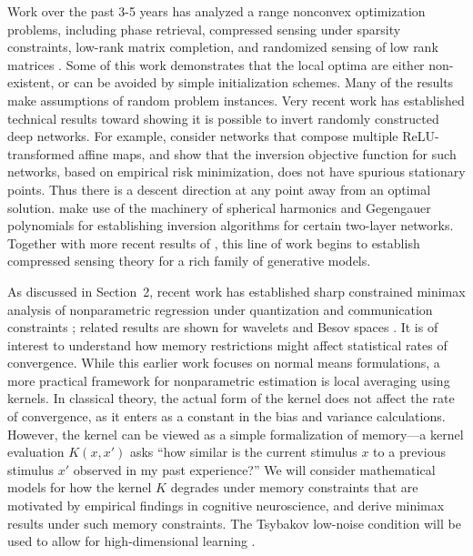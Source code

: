 Work over the past 3-5 years has analyzed a range nonconvex
optimization problems, including phase retrieval, compressed
sensing under sparsity constraints, low-rank matrix
completion, and randomized sensing of low rank matrices
\cite{phaselift_1,phaselift_2,phaselift_3,ZhaWanLiu15,WeiCaiCha16,ZheLaf15,phaselift_1,phaselift_2,phaselift_3,ZhaWanLiu15,WeiCaiCha16}.
Some of this work demonstrates that the local optima are either
non-existent, or can be avoided by simple initialization schemes. Many
of the results make assumptions of random problem instances.  Very
recent work has established technical results toward showing it is
possible to invert randomly constructed deep networks. For example,
\cite{HandV17} consider networks that compose multiple ReLU-transformed affine
maps, and show that the inversion objective function for such networks, based
on empirical risk minimization, does not have spurious stationary
points. Thus there is a descent direction at any point away from an optimal solution.
\cite{Mixon18} make use of the machinery of spherical harmonics and Gegengauer polynomials for
establishing inversion algorithms for certain two-layer
networks. Together with more recent results of \cite{HandV18}, this
line of work begins to establish compressed sensing theory for a rich
family of generative models.


As discussed in Section~2, recent work has established 
sharp constrained minimax analysis of nonparametric
regression under quantization and communication
constraints \citep{Zhu:18,Zhu:18b}; related results are shown
for wavelets and Besov spaces \citep{szabo18}.
It is of interest to understand how memory restrictions might affect
statistical rates of convergence. While this earlier work focuses on
normal means formulations, a more practical framework for
nonparametric estimation is local averaging using kernels. In
classical theory, the actual form of the kernel does not affect the
rate of convergence, as it enters as a constant in the bias and
variance calculations. However, the kernel can be viewed as a
simple formalization of memory---a kernel evaluation $K(x,x')$ asks
``how similar is the current stimulus $x$ to a previous stimulus $x'$
observed in my past experience?'' We will consider mathematical models for
how the kernel $K$ degrades under memory constraints that
are motivated by empirical findings in cognitive neuroscience,
and derive minimax results under such memory constraints. The
Tsybakov low-noise condition will be used to allow for
high-dimensional learning \citep{mammen1999,tsybakov2004,audibert2007}.



